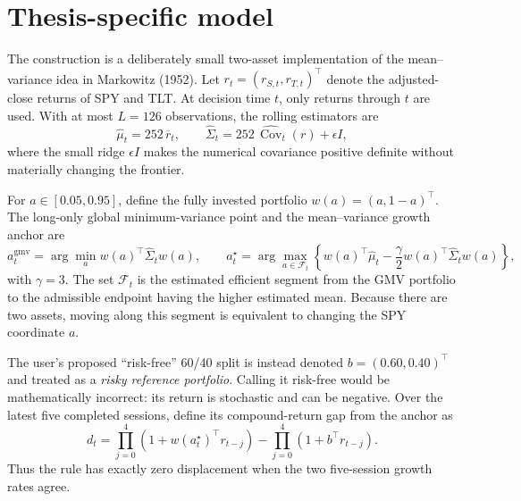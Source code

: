

\section{Thesis-specific model}\label{sec:thesis-math}

The construction is a deliberately small two-asset implementation of the mean--variance idea in
Markowitz (1952).  Let \(r_t=(r_{S,t},r_{T,t})^{\top}\) denote the adjusted-close returns of SPY
and TLT.  At decision time \(t\), only returns through \(t\) are used.  With at most \(L=126\)
observations, the rolling estimators are
\begin{equation}\label{eq:tm-moments}
 \widehat{\mu}_t=252\,\overline r_t,
 \qquad
 \widehat{\Sigma}_t=252\,\widehat{\operatorname{Cov}}_t(r)+\epsilon I,
\end{equation}
where the small ridge \(\epsilon I\) makes the numerical covariance positive definite without
materially changing the frontier.

For \(a\in[0.05,0.95]\), define the fully invested portfolio \(w(a)=(a,1-a)^{\top}\).  The
long-only global minimum-variance point and the mean--variance growth anchor are
\begin{equation}\label{eq:tm-anchor}
 a_t^{\mathrm{gmv}}=\arg\min_a w(a)^{\top}\widehat\Sigma_t w(a),
 \qquad
 a_t^{\star}=\arg\max_{a\in\mathcal F_t}
 \left\{w(a)^{\top}\widehat\mu_t-\frac{\gamma}{2}
 w(a)^{\top}\widehat\Sigma_t w(a)\right\},
\end{equation}
with \(\gamma=3\).  The set \(\mathcal F_t\) is the estimated efficient segment from the GMV
portfolio to the admissible endpoint having the higher estimated mean.  Because there are two
assets, moving along this segment is equivalent to changing the SPY coordinate \(a\).

The user's proposed ``risk-free'' 60/40 split is instead denoted
\(b=(0.60,0.40)^{\top}\) and treated as a \emph{risky reference portfolio}.  Calling it risk-free
would be mathematically incorrect: its return is stochastic and can be negative.  Over the latest
five completed sessions, define its compound-return gap from the anchor as
\begin{equation}\label{eq:tm-growth-gap}
 d_t=\prod_{j=0}^{4}\left(1+w(a_t^{\star})^{\top}r_{t-j}\right)
 -\prod_{j=0}^{4}\left(1+b^{\top}r_{t-j}\right).
\end{equation}
Thus the rule has exactly zero displacement when the two five-session growth rates agree.

